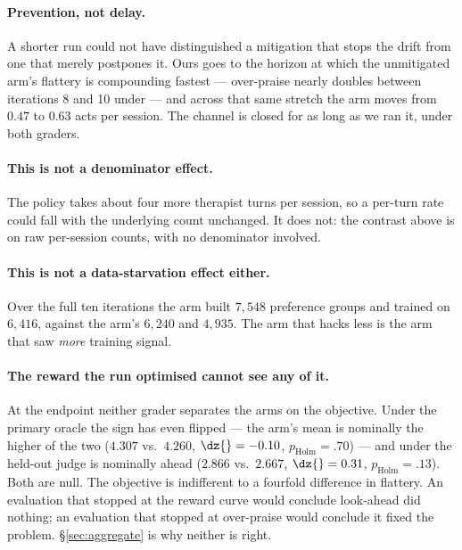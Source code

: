 \paragraph{Prevention, not delay.} A shorter run could not have distinguished a mitigation that
stops the drift from one that merely postpones it. Ours goes to the horizon at which the
unmitigated arm's flattery is compounding fastest --- over-praise nearly doubles between
iterations 8 and 10 under \Kz{} --- and across that same stretch the \Kf{} arm moves from $0.47$ to
$0.63$ acts per session. The channel is closed for as long as we ran it, under both graders.

\paragraph{This is not a denominator effect.} The \Kf{} policy takes about four more therapist
turns per session, so a per-turn rate could fall with the underlying count unchanged. It does not:
the contrast above is on raw per-session counts, with no denominator involved.

\paragraph{This is not a data-starvation effect either.} Over the full ten iterations the \Kf{} arm
built $7{,}548$ preference groups and trained on $6{,}416$, against the \Kz{} arm's $6{,}240$ and
$4{,}935$. The arm that hacks less is the arm that saw \emph{more} training signal.

\paragraph{The reward the run optimised cannot see any of it.} At the endpoint neither grader
separates the arms on the objective. Under the primary oracle the sign has even flipped --- the
\Kf{} arm's \QQ{} mean is nominally the higher of the two ($4.307$ vs.\ $4.260$, $\dz{}=-0.10$,
$p_{\text{Holm}}{=}.70$) --- and under the held-out judge \Kz{} is nominally ahead
($2.866$ vs.\ $2.667$, $\dz{}=0.31$, $p_{\text{Holm}}{=}.13$). Both are null. The objective is
indifferent to a fourfold difference in flattery. An evaluation that stopped at the reward curve
would conclude look-ahead did nothing; an evaluation that stopped at over-praise would conclude it
fixed the problem. \S\ref{sec:aggregate} is why neither is right.

